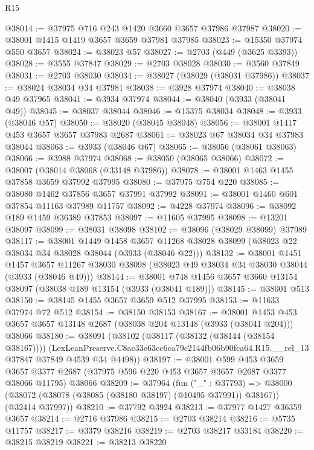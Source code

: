 \begin{lexlean}{R15}
\begin{coremodule}
@38014 := @37975 @716 @243 @1420 @3660 @3657 @37986 @37987
@38020 := @38001 @1415 @1419 @3657 @3659 @37981 @37985
@38023 := @15350 @37974 @550 @3657
@38024 := @38023 @57
@38027 := @2703 (@449 (@3625 @3393))
@38028 := @3555 @37847
@38029 := @2703 @38028
@38030 := @3560 @37849
@38031 := @2703 @38030
@38034 := @38027 (@38029 (@38031 @37986))
@38037 := @38024 @38034 @34 @37981
@38038 := @3928 @37974
@38040 := @38038 @49 @37965
@38041 := @3934 @37974
@38044 := @38040 (@3933 (@38041 @49))
@38045 := @38037 @38044
@38046 := @15375 @38034
@38048 := @3933 (@38046 @57)
@38050 := @38020 (@38045 @38048)
@38056 := @38001 @1417 @453 @3657 @3657 @37983 @2687
@38061 := @38023 @67 @38034 @34 @37983 @38044
@38063 := @3933 (@38046 @67)
@38065 := @38056 (@38061 @38063)
@38066 := @3988 @37974
@38068 := @38050 (@38065 @38066)
@38072 := @38007 (@38014 @38068 (@33148 @37986))
@38078 := @38001 @1463 @1455 @37858 @3659 @37992 @37995
@38080 := @37975 @754 @220
@38085 := @38080 @1462 @37856 @3657 @37991 @37992
@38091 := @38001 @1460 @601 @37854 @11163 @37989 @11757
@38092 := @4228 @37974
@38096 := @38092 @189 @1459 @36389 @37853
@38097 := @11605 @37995
@38098 := @13201 @38097
@38099 := @38031 @38098
@38102 := @38096 (@38029 @38099) @37989
@38117 := @38001
    @1449
    @1458
    @3657
    @11268
    @38028
    @38099
    (@38023 @22 @38034 @34 @38028 @38044 (@3933 (@38046 @22)))
@38132 := @38001
    @1451
    @1457
    @3657
    @11267
    @38030
    @38098
    (@38023 @49 @38034 @34 @38030 @38044 (@3933 (@38046 @49)))
@38144 := @38001 @748 @1456 @3657 @3660 @13154 @38097 (@38038 @189 @13154 (@3933 (@38041 @189)))
@38145 := @38001 @513
@38150 := @38145 @1455 @3657 @3659 @512 @37995
@38153 := @11633 @37974 @72 @512
@38154 := @38150 @38153
@38167 := @38001
    @1453
    @453
    @3657
    @3657
    @13148
    @2687
    (@38038 @204 @13148 (@3933 (@38041 @204)))
    @38066
@38180 := @38091
    (@38102
      (@38117 (@38132 (@38144 (@38154 @38167))))
      (LexLeanPreserve.C8ac33e63cc6ca79c2144fb06b90fca64.R15.__rel_13
        @37847
        @37849
        @4539
        @34
        @4498))
@38197 := @38001
    @599
    @453
    @3659
    @3657
    @3377
    @2687
    (@37975 @596 @220 @453 @3657 @3657 @2687 @3377 @38066 @11795)
    @38066
@38209 := @37964
    (fun ("_" : @37793) =>
    @38000 (@38072 (@38078 (@38085 (@38180 @38197) (@10495 @37991)) @38167)) (@32414 @37997))
@38210 := @37792 @3924
@38213 := @37977 @1427 @36359 @3657
@38214 := @2716 @37986
@38215 := @2703 @38214
@38216 := @5735 @11757
@38217 := @3379 @38216
@38219 := @2703 @38217 @33184
@38220 := @38215 @38219
@38221 := @38213 @38220

\end{coremodule}
\end{lexlean}

